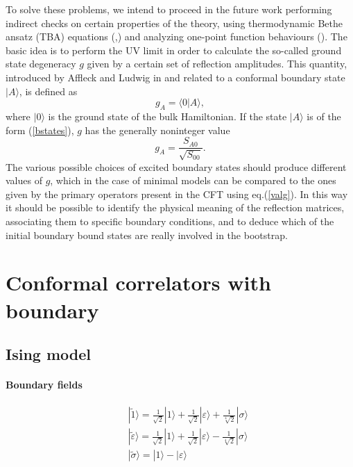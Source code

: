\documentclass[a4paper,12pt]{report}
\begin{document}
\vspace{0.5cm}

To solve these problems, we intend to proceed in the future work performing indirect checks on certain properties
of the theory, using thermodynamic Bethe ansatz (TBA) equations (\cite{TBA1},\cite{TBA2}) and analyzing one-point
function behaviours (\cite{FF}). The basic idea is to perform the UV limit in order to calculate the so-called
ground state degeneracy $g$ given by a certain set of reflection amplitudes. This quantity, introduced by Affleck
and Ludwig in \cite{affllud} and related to a conformal boundary state $|A\rangle$, is defined as
\begin{equation}\label{g}
g_{A}=\langle 0|A\rangle,
\end{equation}
where $|0\rangle$ is the ground state of the bulk Hamiltonian. If the state $|A\rangle$ is of the form
(\ref{bstates}), $g$ has the generally noninteger value
\begin{equation}\label{valg}
g_{A}=\frac{S_{A0}}{\sqrt{S_{00}}}.
\end{equation}
The various possible choices of excited boundary states should produce different values of $g$, which in the case
of minimal models can be compared to the ones given by the primary operators present in the CFT using
eq.(\ref{valg}). In this way it should be possible to identify the physical meaning of the reflection matrices,
associating them to specific boundary conditions, and to deduce which of the initial boundary bound states are
really involved in the bootstrap.




\newpage

\appendix

\chapter{Conformal correlators with boundary}
\label{confcalc}

\section{Ising model}

\subsubsection{Boundary fields}
\begin{eqnarray*}
&&|\tilde{1}\rangle=\frac{1}{\sqrt{2}}|1\rangle+\frac{1}{\sqrt{2}}|\varepsilon\rangle+\frac{1}{\sqrt[4]{2}}|\sigma\rangle\\
&&|\tilde{\varepsilon}\rangle=\frac{1}{\sqrt{2}}|1\rangle+\frac{1}{\sqrt{2}}|\varepsilon\rangle-\frac{1}{\sqrt[4]{2}}|\sigma\rangle\\
&&|\tilde{\sigma}\rangle=|1\rangle-|\varepsilon\rangle\\
\end{eqnarray*}
\end{document}
